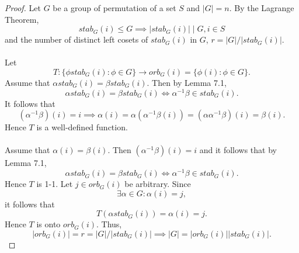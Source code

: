 \documentclass{article}
\theoremstyle{definition}
\begin{document}
     \begin{proof}
        Let $G$ be a group of permutation of a set $S$ and $|G|=n$. By the Lagrange Theorem,
        \begin{equation*}
            stab_G(i) \leq G \implies |stab_G(i)| \mid G, i \in S
        \end{equation*}
        and the number of distinct left cosets of $stab_G(i)$ in $G$, $r = |G|/|stab_G(i)|$.
        \\ \\
        Let
        \begin{equation*}
            T: \{\phi stab_G(i): \phi \in G\} \to orb_G(i) = \{\phi(i): \phi \in G\}.
        \end{equation*}
        Assume that $\alpha stab_G(i) = \beta stab_G(i)$. Then by Lemma 7.1,
        \begin{equation*}
            \alpha stab_G(i) = \beta stab_G(i) \iff \alpha^{-1}\beta \in stab_G(i).
        \end{equation*}
        It follows that
        \begin{equation*}
            (\alpha^{-1}\beta)(i) = i \implies \alpha(i) = \alpha(\alpha^{-1}\beta(i)) = (\alpha\alpha^{-1}\beta)(i) = \beta(i).
        \end{equation*}
        Hence $T$ is a well-defined function. 
        \\ \\
        Assume that $\alpha(i) = \beta(i)$. Then $(\alpha^{-1}\beta)(i) = i$ and it follows that by Lemma 7.1,
        \begin{equation*}
            \alpha stab_G(i) = \beta stab_G(i) \iff \alpha^{-1}\beta \in stab_G(i).
        \end{equation*}
        Hence $T$ is 1-1. Let $j \in orb_G(i)$ be arbitrary. Since
        \begin{equation*}
            \exists \alpha \in G: \alpha(i) = j,
        \end{equation*}
        it follows that
        \begin{equation*}
            T(\alpha stab_G(i)) = \alpha(i) = j.
        \end{equation*}
        Hence $T$ is onto $orb_G(i)$. Thus, 
        \begin{equation*}
            |orb_G(i)| = r = |G|/|stab_G(i)| \implies |G| = |orb_G(i)||stab_G(i)|.
        \end{equation*}
     \end{proof}
     
\end{document}
